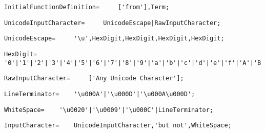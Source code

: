 \documentclass{article}
\begin{document}
    \begin{flushleft}
    \begin{lstlisting}[mathescape=true, breaklines=true]
     InitialFunctionDefinition= 	['from'],Term;
    \end{lstlisting}
    \end{flushleft}
    \begin{flushleft}
    \begin{lstlisting}[mathescape=true, breaklines=true]
     UnicodeInputCharacter= 	UnicodeEscape|RawInputCharacter;
    \end{lstlisting}
    \end{flushleft}
    \begin{flushleft}
    \begin{lstlisting}[mathescape=true, breaklines=true]
     UnicodeEscape= 	'\u',HexDigit,HexDigit,HexDigit,HexDigit;
    \end{lstlisting}
    \end{flushleft}
    \begin{flushleft}
    \begin{lstlisting}[mathescape=true, breaklines=true]
     HexDigit= 	'0'|'1'|'2'|'3'|'4'|'5'|'6'|'7'|'8'|'9'|'a'|'b'|'c'|'d'|'e'|'f'|'A'|'B'|'C'|'D'|'E'|'F';
    \end{lstlisting}
    \end{flushleft}
    \begin{flushleft}
    \begin{lstlisting}[mathescape=true, breaklines=true]
     RawInputCharacter= 	['Any Unicode Character'];
    \end{lstlisting}
    \end{flushleft}
    \begin{flushleft}
    \begin{lstlisting}[mathescape=true, breaklines=true]
     LineTerminator= 	'\u000A'|'\u000D'|'\u000A\u000D';
    \end{lstlisting}
    \end{flushleft}
    \begin{flushleft}
    \begin{lstlisting}[mathescape=true, breaklines=true]
     WhiteSpace= 	'\u0020'|'\u0009'|'\u000C'|LineTerminator;
    \end{lstlisting}
    \end{flushleft}
    \begin{flushleft}
    \begin{lstlisting}[mathescape=true, breaklines=true]
     InputCharacter= 	UnicodeInputCharacter,'but not',WhiteSpace;
    \end{lstlisting}
    \end{flushleft}
\end{document}
